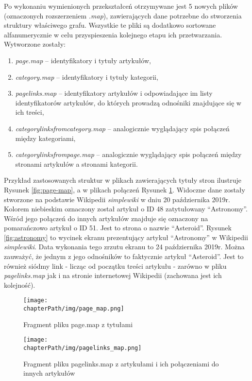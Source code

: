 Po wykonaniu wymienionych przekształceń otrzymywane jest 5 nowych plików (oznaczonych rozszerzeniem \textit{.map}), zawierających dane potrzebne do stworzenia struktury właściwego grafu. Wszystkie te pliki są dodatkowo sortowane alfanumerycznie w celu przyspieszenia kolejnego etapu ich przetwarzania. Wytworzone zostały:

\begin{enumerate}[label=\textbullet]
    \setlength\itemsep{1.1em}
    \item \textit{page.map} – identyfikatory i tytuły artykułów,
    \item \textit{category.map} – identyfikatory i tytuły kategorii,
    \item \textit{pagelinks.map} – identyfikatory artykułów i odpowiadające im listy identyfikatorów artykułów, do których prowadzą odnośniki znajdujące się w ich treści,
    \item \textit{categorylinksfromcategory.map} – analogicznie wyglądający spis połączeń między kategoriami,
    \item \textit{categorylinksfrompage.map} – analogicznie wyglądający spis połączeń między stronami artykułów a stronami kategorii.
\end{enumerate}

Przykład zastosowanych struktur w plikach zawierających tytuły stron ilustruje Rysunek \ref{fig:page-map}, a w plikach połączeń Rysunek \ref{fig:pagelinks-map}. Widoczne dane zostały stworzone na podstawie Wikipedii \textit{simplewiki} w dniu 20 października 2019r. Kolorem niebieskim oznaczony został artykuł o ID 48 zatytułowany ``Astronomy''. Wśród jego połączeń do innych artykułów znajduje się oznaczony na pomarańczowo artykuł o ID 51. Jest to strona o nazwie ``Asteroid''. Rysunek \ref{fig:astronomy} to wycinek ekranu prezentujący artykuł ``Astronomy'' w Wikipedii \textit{simplewiki}. Data wykonania tego zrzutu ekranu to 24 października 2019r. Można zauważyć, że jednym z jego odnośników to faktycznie artykuł ``Asteroid''. Jest to również siódmy link - licząc od początku treści artykułu - zarówno w pliku \textit{pagelinks.map} jak i na stronie internetowej Wikipedii (zachowana jest ich kolejność).

\begin{figure}[!h]
    \begin{minipage}[c]{0.2118115\linewidth}
        \texttt{[image: \\chapterPath/img/page\_map.png]}
        \caption{\small Fragment pliku page.map z tytułami}
        \label{fig:page-map}
    \end{minipage}
    \begin{minipage}[c]{0.7081884\linewidth}
        \texttt{[image: \\chapterPath/img/pagelinks\_map.png]}
        \caption{\small Fragment pliku pagelinks.map z artykułami i ich połączeniami do innych artykułów}
        \label{fig:pagelinks-map}
    \end{minipage}
\end{figure}


